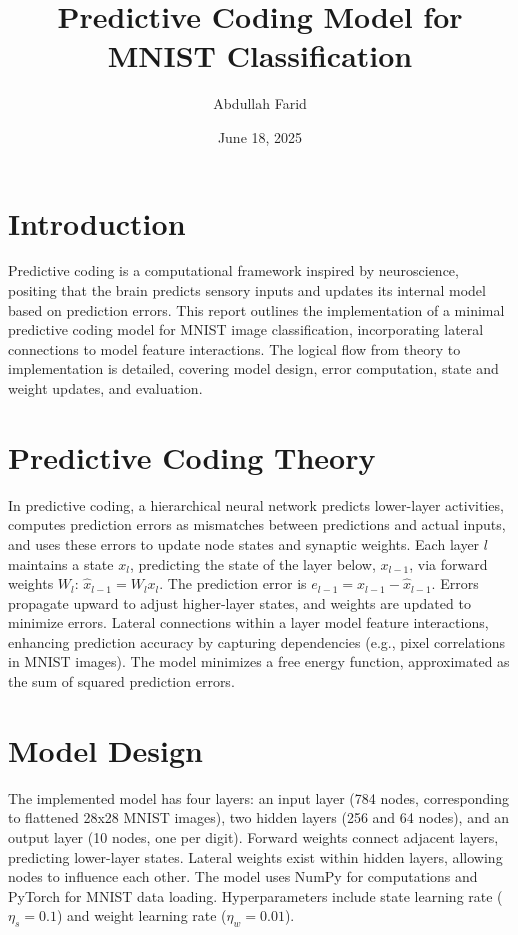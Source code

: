 \documentclass[a4paper,12pt]{article}
\begin{document}
     \title{Predictive Coding Model for MNIST Classification}
     \author{Abdullah Farid}
     \date{June 18, 2025}
     \maketitle

     \section{Introduction}
     Predictive coding is a computational framework inspired by neuroscience, positing that the brain predicts sensory inputs and updates its internal model based on prediction errors. This report outlines the implementation of a minimal predictive coding model for MNIST image classification, incorporating lateral connections to model feature interactions. The logical flow from theory to implementation is detailed, covering model design, error computation, state and weight updates, and evaluation.

     \section{Predictive Coding Theory}
     In predictive coding, a hierarchical neural network predicts lower-layer activities, computes prediction errors as mismatches between predictions and actual inputs, and uses these errors to update node states and synaptic weights. Each layer $l$ maintains a state $x_l$, predicting the state of the layer below, $x_{l-1}$, via forward weights $W_l$: $\hat{x}_{l-1} = W_l x_l$. The prediction error is $e_{l-1} = x_{l-1} - \hat{x}_{l-1}$. Errors propagate upward to adjust higher-layer states, and weights are updated to minimize errors. Lateral connections within a layer model feature interactions, enhancing prediction accuracy by capturing dependencies (e.g., pixel correlations in MNIST images). The model minimizes a free energy function, approximated as the sum of squared prediction errors.

     \section{Model Design}
     The implemented model has four layers: an input layer (784 nodes, corresponding to flattened 28x28 MNIST images), two hidden layers (256 and 64 nodes), and an output layer (10 nodes, one per digit). Forward weights connect adjacent layers, predicting lower-layer states. Lateral weights exist within hidden layers, allowing nodes to influence each other. The model uses NumPy for computations and PyTorch for MNIST data loading. Hyperparameters include state learning rate ($\eta_s = 0.1$) and weight learning rate ($\eta_w = 0.01$).
\end{document}
